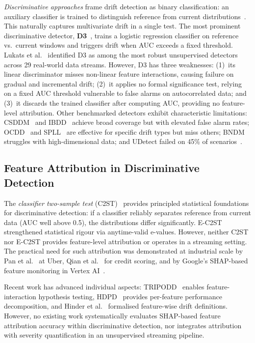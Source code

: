 \documentclass[conference,a4paper]{IEEEtran}
\begin{document}
\textit{Discriminative approaches} frame drift detection as binary classification: an auxiliary classifier is trained to distinguish reference from current distributions~\cite{b9,b13,b14,b19}. This naturally captures multivariate drift in a single test. The most prominent discriminative detector, \textbf{D3}~\cite{b9}, trains a logistic regression classifier on reference vs.\ current windows and triggers drift when AUC exceeds a fixed threshold. Lukats et al.~\cite{b10} identified D3 as among the most robust unsupervised detectors across 29 real-world data streams. However, D3 has three weaknesses: (1)~its linear discriminator misses non-linear feature interactions, causing failure on gradual and incremental drift; (2)~it applies no formal significance test, relying on a fixed AUC threshold vulnerable to false alarms on autocorrelated data; and (3)~it discards the trained classifier after computing AUC, providing no feature-level attribution. Other benchmarked detectors exhibit characteristic limitations: CSDDM~\cite{b15} and IBDD~\cite{b16} achieve broad coverage but with elevated false alarm rates; OCDD~\cite{b17} and SPLL~\cite{b18} are effective for specific drift types but miss others; BNDM struggles with high-dimensional data; and UDetect failed on 45\% of scenarios~\cite{b10}.

\subsection{Feature Attribution in Discriminative Detection}

The \textit{classifier two-sample test} (C2ST)~\cite{b19} provides principled statistical foundations for discriminative detection: if a classifier reliably separates reference from current data (AUC well above 0.5), the distributions differ significantly. E-C2ST~\cite{b27} strengthened statistical rigour via anytime-valid e-values. However, neither C2ST nor E-C2ST provides feature-level attribution or operates in a streaming setting. The practical need for such attribution was demonstrated at industrial scale by Pan et al.~\cite{b13} at Uber, Qian et al.~\cite{b14} for credit scoring, and by Google's SHAP-based feature monitoring in Vertex AI~\cite{b20}.

Recent work has advanced individual aspects: TRIPODD~\cite{b28} enables feature-interaction hypothesis testing, HDPD~\cite{b29} provides per-feature performance decomposition, and Hinder et al.~\cite{b32} formalised feature-wise drift definitions. However, no existing work systematically evaluates SHAP-based feature attribution accuracy within discriminative detection, nor integrates attribution with severity quantification in an unsupervised streaming pipeline.
\end{document}
